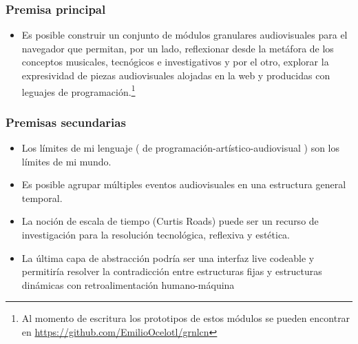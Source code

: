 \documentclass[12pt,a4paper, openright,
headinclude,footinclude,BCOR5mm,
numbers=noenddot,cleardoublepage=empty,
tablecaptionabove]{article}
\begin{document}

\subsubsection{Premisa principal}



\begin{itemize}
\item Es posible construir un conjunto de módulos granulares audiovisuales para el navegador que permitan, por un lado, reflexionar desde la metáfora de los conceptos musicales, tecnógicos e investigativos y por el otro, explorar la expresividad de piezas audiovisuales alojadas en la web y producidas con leguajes de programación.\footnote{Al momento de escritura los prototipos de estos módulos se pueden encontrar en \url{https://github.com/EmilioOcelotl/grnlcn}}
\end{itemize}

\subsubsection{Premisas secundarias}


\begin{itemize}
  
\item Los límites de mi lenguaje ( de programación-artístico-audiovisual ) son los límites de mi mundo.
\item Es posible agrupar múltiples eventos audiovisuales en una estructura general temporal.
\item La noción de escala de tiempo (Curtis Roads) puede ser un recurso de investigación para la resolución tecnológica, reflexiva y estética.

  
\item La última capa de abstracción podría ser una interfaz live codeable y permitiría resolver la contradicción entre estructuras fijas y estructuras dinámicas con retroalimentación humano-máquina


\end{itemize}
\end{document}
